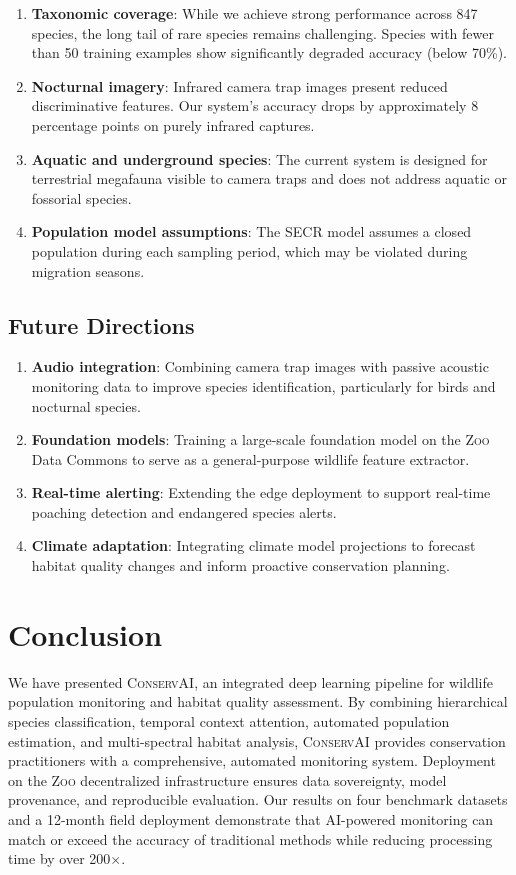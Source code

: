 \documentclass[11pt,letterpaper]{article}
\newcommand{\Zoo}{\textsc{Zoo}}
\newcommand{\ConservAI}{\textsc{ConservAI}}
\begin{document}
\begin{enumerate}[leftmargin=*]
    \item \textbf{Taxonomic coverage}: While we achieve strong performance across 847 species, the long tail of rare species remains challenging. Species with fewer than 50 training examples show significantly degraded accuracy (below 70\%).
    \item \textbf{Nocturnal imagery}: Infrared camera trap images present reduced discriminative features. Our system's accuracy drops by approximately 8 percentage points on purely infrared captures.
    \item \textbf{Aquatic and underground species}: The current system is designed for terrestrial megafauna visible to camera traps and does not address aquatic or fossorial species.
    \item \textbf{Population model assumptions}: The SECR model assumes a closed population during each sampling period, which may be violated during migration seasons.
\end{enumerate}

\subsection{Future Directions}

\begin{enumerate}[leftmargin=*]
    \item \textbf{Audio integration}: Combining camera trap images with passive acoustic monitoring data to improve species identification, particularly for birds and nocturnal species.
    \item \textbf{Foundation models}: Training a large-scale foundation model on the \Zoo{} Data Commons to serve as a general-purpose wildlife feature extractor.
    \item \textbf{Real-time alerting}: Extending the edge deployment to support real-time poaching detection and endangered species alerts.
    \item \textbf{Climate adaptation}: Integrating climate model projections to forecast habitat quality changes and inform proactive conservation planning.
\end{enumerate}

\section{Conclusion}

We have presented \ConservAI{}, an integrated deep learning pipeline for wildlife population monitoring and habitat quality assessment. By combining hierarchical species classification, temporal context attention, automated population estimation, and multi-spectral habitat analysis, \ConservAI{} provides conservation practitioners with a comprehensive, automated monitoring system. Deployment on the \Zoo{} decentralized infrastructure ensures data sovereignty, model provenance, and reproducible evaluation. Our results on four benchmark datasets and a 12-month field deployment demonstrate that AI-powered monitoring can match or exceed the accuracy of traditional methods while reducing processing time by over 200$\times$.
\end{document}
